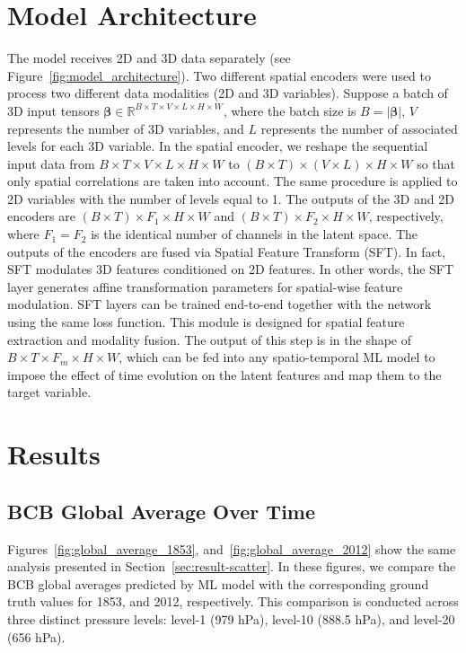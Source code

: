 \documentclass[11pt]{article}
\begin{document}
\section{Model Architecture} \label{sec:appendix-2}
    The model receives 2D and 3D data separately (see Figure~\ref{fig:model_architecture}). Two different spatial encoders were used to process two different data modalities (2D and 3D variables). Suppose a batch of 3D input tensors $\mathbf{\beta} \in \mathbb{R}^{B \times T \times V \times L \times H \times W}$, where the batch size is $B = |\mathbf{\beta}|$, $V$ represents the number of 3D variables, and $L$ represents the number of associated levels for each 3D variable. In the spatial encoder, we reshape the sequential input data from $B \times T \times V \times L \times H \times W$ to $(B \times T) \times (V \times L) \times H \times W$ so that only spatial correlations are taken into account. The same procedure is applied to 2D variables with the number of levels equal to 1. The outputs of the 3D and 2D encoders are $(B \times T) \times F_1 \times H \times W$ and $(B \times T) \times F_2 \times H \times W$, respectively, where $F_1 = F_2$ is the identical number of channels in the latent space. The outputs of the encoders are fused via Spatial Feature Transform (SFT). In fact, SFT modulates 3D features conditioned on 2D features. In other words, the SFT layer generates affine transformation parameters for spatial-wise feature modulation. SFT layers can be trained end-to-end together with the network using the same loss function. This module is designed for spatial feature extraction and modality fusion. The output of this step is in the shape of $B \times T \times F_m \times H \times W$, which can be fed into any spatio-temporal ML model to impose the effect of time evolution on the latent features and map them to the target variable.


\section{Results} \label{sec:appendix-3}
    \subsection{BCB Global Average Over Time}
    Figures~\ref{fig:global_average_1853}, and~\ref{fig:global_average_2012} show the same analysis presented in Section~\ref{sec:result-scatter}. In these figures, we compare the BCB global averages predicted by ML model with the corresponding ground truth values for 1853, and 2012, respectively. This comparison is conducted across three distinct pressure levels: level-1 (979 hPa), level-10 (888.5 hPa), and level-20 (656 hPa).
    
\end{document}
